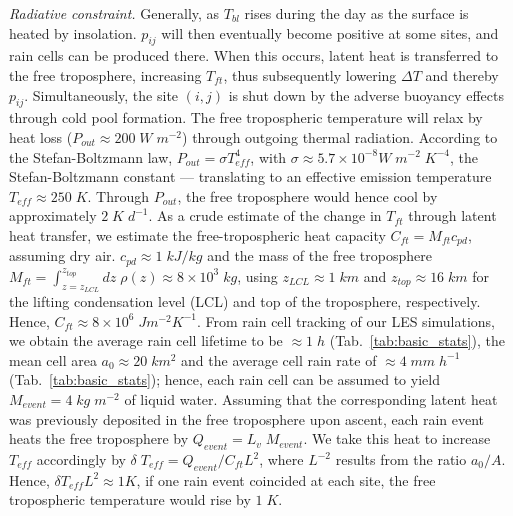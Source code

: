 \documentclass{article}
\begin{document}
\begin{methods}
\noindent
{\it Radiative constraint.}
Generally, as $T_{bl}$ rises during the day as the surface is heated by insolation. 
$p_{ij}$ will then eventually become positive at some sites, and rain cells can be produced there.
When this occurs, latent heat is transferred to the free troposphere, increasing $T_{ft}$, thus subsequently lowering $\Delta T$ and thereby $p_{ij}$.
Simultaneously, the site $(i,j)$ is shut down by the adverse buoyancy effects through cold pool formation.
The free tropospheric temperature will relax by heat loss ($P_{out}\approx 200\;W\;m^{-2}$) through outgoing thermal radiation. 
According to the Stefan-Boltzmann law, $P_{out}=\sigma T_{eff}^4$, with $\sigma\approx 5.7\times 10^{-8}W\;m^{-2}\;K^{-4}$, the Stefan-Boltzmann constant --- translating to an effective emission temperature $T_{eff}\approx 250\;K$. 
Through $P_{out}$, the free troposphere would hence cool by approximately $2\;K\;d^{-1}$.
As a crude estimate of the change in $T_{ft}$ through latent heat transfer, we estimate the free-tropospheric heat capacity $C_{ft}=M_{ft}c_{pd}$, assuming dry air.
$c_{pd}\approx 1\;kJ/kg$ and the mass of the free troposphere $M_{ft}=\int_{z=z_{LCL}}^{z_{top}}dz\;\rho(z)\approx 8\times 10^3\;kg$, using $z_{LCL}\approx 1\;km$ and $z_{top}\approx 16\;km$ for the lifting condensation level (LCL) and top of the troposphere, respectively.
Hence, $C_{ft}\approx 8\times 10^6\;Jm^{-2}K^{-1}$.
From rain cell tracking of our LES simulations, we obtain the average rain cell lifetime to be $\approx 1\;h$ (Tab.~\ref{tab:basic_stats}), the mean cell area $a_0\approx 20\;km^2$ and the average cell rain rate of $\approx 4\;mm\;h^{-1}$ (Tab.~\ref{tab:basic_stats}); hence, each rain cell can be assumed to yield $M_{event}=4\;kg\;m^{-2}$ of liquid water.
Assuming that the corresponding latent heat was previously deposited in the free troposphere upon ascent, each rain event heats the free troposphere by $Q_{event}=L_v\;M_{event}$.
We take this heat to increase $T_{eff}$ accordingly by $\delta\;T_{eff}=Q_{event}/C_{ft}L^{2}$, where $L^{-2}$ results from the ratio $a_0/A$.
Hence, $\delta T_{eff}L^2\approx 1K$, if one rain event coincided at each site, the free tropospheric temperature would rise by $1\;K$.



\end{methods}
\end{document}
